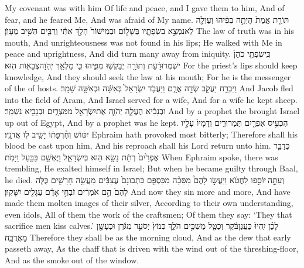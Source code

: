 {My covenant was with him Of life and peace, and I gave them to him, And of fear, and he feared Me, And was afraid of My name.}
{תּוֹרַ֤ת אֱמֶת֙ הָיְתָ֣ה בְּפִ֔יהוּ וְעַוְלָ֖ה לֹֽא\maqqaf נִמְצָ֣א בִשְׂפָתָ֑יו בְּשָׁל֤וֹם וּבְמִישׁוֹר֙ הָלַ֣ךְ אִתִּ֔י וְרַבִּ֖ים הֵשִׁ֥יב מֵעָוֺֽן׃}
{The law of truth was in his mouth, And unrighteousness was not found in his lips; He walked with Me in peace and uprightness, And did turn many away from iniquity.}
{כִּֽי\maqqaf שִׂפְתֵ֤י כֹהֵן֙ יִשְׁמְרוּ\maqqaf דַ֔עַת וְתוֹרָ֖ה יְבַקְשׁ֣וּ מִפִּ֑יהוּ כִּ֛י מַלְאַ֥ךְ יְהֹֽוָה\maqqaf צְבָא֖וֹת הֽוּא׃}
{For the priest’s lips should keep knowledge, And they should seek the law at his mouth; For he is the messenger of the \lord\space of hosts.}
\newperek
{}
\label{haft_7}
\setcounter{chap}{12}
\setcounter{verse}{13}
{וַיִּבְרַ֥ח יַעֲקֹ֖ב שְׂדֵ֣ה אֲרָ֑ם וַיַּעֲבֹ֤ד יִשְׂרָאֵל֙ בְּאִשָּׁ֔ה וּבְאִשָּׁ֖ה שָׁמָֽר׃}
{And Jacob fled into the field of Aram, And Israel served for a wife, And for a wife he kept sheep.}
{וּבְנָבִ֕יא הֶעֱלָ֧ה יְהֹוָ֛ה אֶת\maqqaf יִשְׂרָאֵ֖ל מִמִּצְרָ֑יִם וּבְנָבִ֖יא נִשְׁמָֽר׃}
{And by a prophet the \lord\space brought Israel up out of Egypt, And by a prophet was he kept.}
{הִכְעִ֥יס אֶפְרַ֖יִם תַּמְרוּרִ֑ים וְדָמָיו֙ עָלָ֣יו יִטּ֔וֹשׁ וְחֶ֨רְפָּת֔וֹ יָשִׁ֥יב ל֖וֹ אֲדֹנָֽיו׃}
{Ephraim hath provoked most bitterly; Therefore shall his blood be cast upon him, And his reproach shall his Lord return unto him.}
\newperek
{}
{כְּדַבֵּ֤ר אֶפְרַ֙יִם֙ רְתֵ֔ת נָשָׂ֥א ה֖וּא בְּיִשְׂרָאֵ֑ל וַיֶּאְשַׁ֥ם בַּבַּ֖עַל וַיָּמֹֽת׃}
{When Ephraim spoke, there was trembling, He exalted himself in Israel; But when he became guilty through Baal, he died.}
{וְעַתָּ֣ה \legarmeh  יוֹסִ֣פוּ לַחֲטֹ֗א וַיַּעֲשׂ֣וּ לָהֶם֩ מַסֵּכָ֨ה מִכַּסְפָּ֤ם כִּתְבוּנָם֙ עֲצַבִּ֔ים מַעֲשֵׂ֥ה חָרָשִׁ֖ים כֻּלֹּ֑ה לָהֶם֙ הֵ֣ם אֹמְרִ֔ים זֹבְחֵ֣י אָדָ֔ם עֲגָלִ֖ים יִשָּׁקֽוּן׃}
{And now they sin more and more, And have made them molten images of their silver, According to their own understanding, even idols, All of them the work of the craftsmen; Of them they say: ‘They that sacrifice men kiss calves.’}
{לָכֵ֗ן יִֽהְיוּ֙ כַּעֲנַן\maqqaf בֹּ֔קֶר וְכַטַּ֖ל מַשְׁכִּ֣ים הֹלֵ֑ךְ כְּמֹץ֙ יְסֹעֵ֣ר מִגֹּ֔רֶן וּכְעָשָׁ֖ן מֵאֲרֻבָּֽה׃}
{Therefore they shall be as the morning cloud, And as the dew that early passeth away, As the chaff that is driven with the wind out of the threshing-floor, And as the smoke out of the window.}

